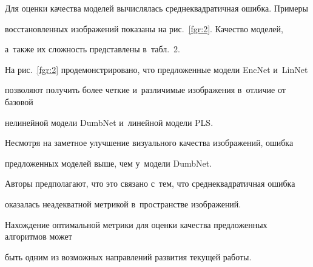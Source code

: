 Для оценки качества моделей вычислялась среднеквадратичная ошибка. Примеры 

восстановленных изображений показаны на рис.~\ref{fgr:2}. Качество моделей, 

а~также их сложность представлены в~табл.~2.

На рис.~\ref{fgr:2} продемонстрировано, что предложенные модели EncNet и~LinNet 

позволяют получить более четкие и~различимые изображения в~отличие от базовой 

нелинейной модели DumbNet и~линейной модели PLS.

Несмотря на заметное улучшение визуального качества изображений, ошибка 

предложенных моделей выше, чем у~модели DumbNet.

Авторы предполагают, что это связано с~тем, что среднеквадратичная ошибка 

оказалась неадекватной метрикой в~пространстве изображений.

Нахождение оптимальной метрики для оценки качества предложенных алгоритмов может 

быть одним из возможных направлений развития текущей работы.





